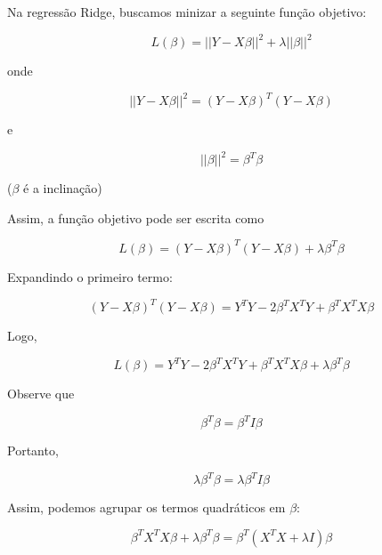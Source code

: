 \documentclass{article}
\begin{document}
Na regressão Ridge, buscamos minizar a seguinte função objetivo:

\begin{equation*}
    L(\beta) = || Y - X\beta ||^{2} + \lambda || \beta || ^2
\end{equation*}

onde 

\begin{equation*}
    || Y - X \beta || ^2 = (Y - X \beta)^{T}(Y - X \beta)
\end{equation*}

e

\begin{equation*}
    || \beta || ^2 = \beta^{T}\beta
\end{equation*}

($\beta$ é a inclinação)

Assim, a função objetivo pode ser escrita como

\begin{equation*}
    L(\beta) = (Y - X\beta)^T(Y - X\beta) + \lambda \beta^T \beta
\end{equation*}

Expandindo o primeiro termo:

\begin{equation*}
    (Y - X\beta)^T(Y - X\beta) = Y^TY - 2\beta^TX^TY + \beta^TX^TX\beta
\end{equation*}

Logo,

\begin{equation*}
    L(\beta) = Y^TY - 2\beta^TX^TY + \beta^TX^TX\beta + \lambda \beta^T\beta
\end{equation*}

Observe que

\begin{equation*}
    \beta^T\beta = \beta^T I \beta
\end{equation*}

Portanto,

\begin{equation*}
    \lambda \beta^T \beta = \lambda \beta^T I \beta
\end{equation*}

Assim, podemos agrupar os termos quadráticos em $\beta$:

\begin{equation*}
    \beta^T X^T X \beta + \lambda \beta^T \beta = \beta^T (X^TX + \lambda I)\beta
\end{equation*}
\end{document}
